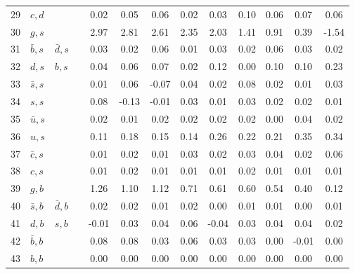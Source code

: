 \begin{tabularx}{\textwidth}{rXXX@{}S@{}S@{}S@{}S@{}S@{}S@{}S@{}S@{}S}
 29 & $c, d$           &                   &                  &  0.02 &  0.05 &  0.06 &  0.02 &  0.03 &  0.10 &  0.06 &  0.07 &  0.06 \\
 30 & $g, s$           &                   &                  &  2.97 &  2.81 &  2.61 &  2.35 &  2.03 &  1.41 &  0.91 &  0.39 & -1.54 \\
 31 & $\bar b, s$      & $\bar d, s$       &                  &  0.03 &  0.02 &  0.06 &  0.01 &  0.03 &  0.02 &  0.06 &  0.03 &  0.02 \\
 32 & $d, s$           & $b, s$            &                  &  0.04 &  0.06 &  0.07 &  0.02 &  0.12 &  0.00 &  0.10 &  0.10 &  0.23 \\
 33 & $\bar s, s$      &                   &                  &  0.01 &  0.06 & -0.07 &  0.04 &  0.02 &  0.08 &  0.02 &  0.01 &  0.03 \\
 34 & $s, s$           &                   &                  &  0.08 & -0.13 & -0.01 &  0.03 &  0.01 &  0.03 &  0.02 &  0.02 &  0.01 \\
 35 & $\bar u, s$      &                   &                  &  0.02 &  0.01 &  0.02 &  0.02 &  0.02 &  0.02 &  0.00 &  0.04 &  0.02 \\
 36 & $u, s$           &                   &                  &  0.11 &  0.18 &  0.15 &  0.14 &  0.26 &  0.22 &  0.21 &  0.35 &  0.34 \\
 37 & $\bar c, s$      &                   &                  &  0.01 &  0.02 &  0.01 &  0.03 &  0.02 &  0.03 &  0.04 &  0.02 &  0.06 \\
 38 & $c, s$           &                   &                  &  0.01 &  0.02 &  0.01 &  0.01 &  0.01 &  0.02 &  0.01 &  0.01 &  0.01 \\
 39 & $g,  b$          &                   &                  &  1.26 &  1.10 &  1.12 &  0.71 &  0.61 &  0.60 &  0.54 &  0.40 &  0.12 \\
 40 & $\bar s, b$      & $\bar d, b$       &                  &  0.02 &  0.02 &  0.01 &  0.02 &  0.00 &  0.01 &  0.01 &  0.00 &  0.01 \\
 41 & $d, b$           & $s, b$            &                  & -0.01 &  0.03 &  0.04 &  0.06 & -0.04 &  0.03 &  0.04 &  0.04 &  0.02 \\
 42 & $\bar b, b$      &                   &                  &  0.08 &  0.08 &  0.03 &  0.06 &  0.03 &  0.03 &  0.00 & -0.01 &  0.00 \\
 43 & $b, b$           &                   &                  &  0.00 &  0.00 &  0.00 &  0.00 &  0.00 &  0.00 &  0.00 &  0.00 &  0.00 \\

\end{tabularx}
